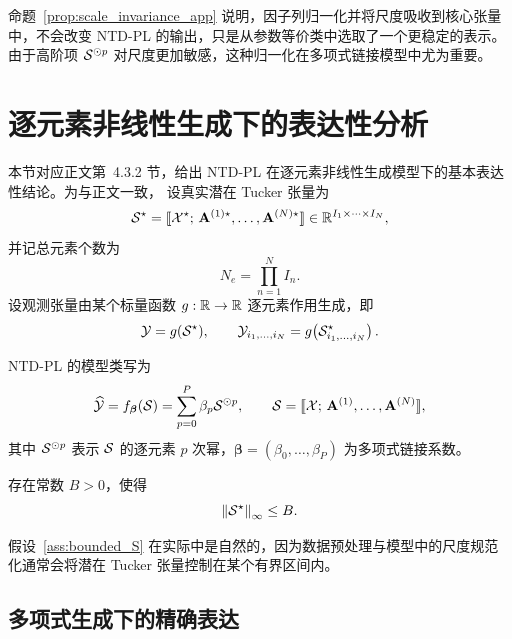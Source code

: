 \begin{remark}
命题~\ref{prop:scale_invariance_app} 说明，因子列归一化并将尺度吸收到核心张量中，不会改变 NTD-PL 的输出，只是从参数等价类中选取了一个更稳定的表示。由于高阶项 $\mathcal{S}^{\odot p}$ 对尺度更加敏感，这种归一化在多项式链接模型中尤为重要。
\end{remark}

\section{逐元素非线性生成下的表达性分析}
\label{app:expressivity}

本节对应正文第~4.3.2 节，给出 NTD-PL 在逐元素非线性生成模型下的基本表达性结论。为与正文一致，
设真实潜在 Tucker 张量为
\begin{equation}
\mathcal{S}^\star
=
\llbracket
\mathcal{X}^\star;\,
\mathbf A^{(1)\star},\dots,\mathbf A^{(N)\star}
\rrbracket
\in \mathbb{R}^{I_1\times\cdots\times I_N},
\end{equation}
并记总元素个数为
\begin{equation}
N_e=\prod_{n=1}^N I_n.
\end{equation}
设观测张量由某个标量函数 $g:\mathbb{R}\to\mathbb{R}$ 逐元素作用生成，即
\begin{equation}
\mathcal{Y} = g(\mathcal{S}^\star), \qquad
\mathcal{Y}_{i_1,\dots,i_N}
=
g\!\left(\mathcal{S}^\star_{i_1,\dots,i_N}\right).
\end{equation}

NTD-PL 的模型类写为
\begin{equation}
\widehat{\mathcal{Y}}
=
f_{\boldsymbol\beta}(\mathcal{S})
=
\sum_{p=0}^{P}\beta_p \mathcal{S}^{\odot p},
\qquad
\mathcal{S}=
\llbracket
\mathcal{X};\,
\mathbf A^{(1)},\dots,\mathbf A^{(N)}
\rrbracket,
\label{eq:ntdpl_appendix_model}
\end{equation}
其中 $\mathcal{S}^{\odot p}$ 表示 $\mathcal{S}$ 的逐元素 $p$ 次幂，$\boldsymbol\beta=(\beta_0,\dots,\beta_P)$ 为多项式链接系数。

\begin{assumption}[有界性假设]
\label{ass:bounded_S}
存在常数 $B>0$，使得
\begin{equation}
\left\lVert \mathcal{S}^\star \right\rVert_{\infty}\le B.
\end{equation}
\end{assumption}

假设~\ref{ass:bounded_S} 在实际中是自然的，因为数据预处理与模型中的尺度规范化通常会将潜在 Tucker 张量控制在某个有界区间内。

\subsection{多项式生成下的精确表达}

